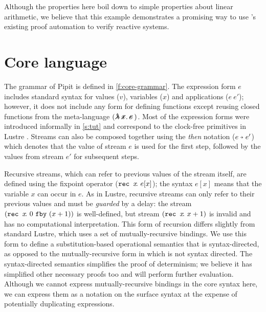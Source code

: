 \documentclass[sigplan,screen, review]{acmart}
\begin{document}
Although the properties here boil down to simple properties about linear arithmetic, we believe that this example demonstrates a promising way to use \fstar{}'s existing proof automation to verify reactive systems.

\section{Core language}
\label{s:core}


% 
% 

The grammar of Pipit is defined in \autoref{f:core-grammar}.
The expression form $e$ includes standard syntax for values ($v$), variables ($x$) and applications ($e~e'$); however, it does not include any form for defining functions except reusing closed functions from the \fstar{} meta-language $(\mlamX{})$.
Most of the expression forms were introduced informally in \autoref{s:tut} and correspond to the clock-free primitives in Lustre \cite{caspi1995functional}.
Streams can also be composed together using the \emph{then} notation ($\xthen{e}{e'}$) which denotes that the value of stream $e$ is used for the first step, followed by the values from stream $e'$ for subsequent steps.

Recursive streams, which can refer to previous values of the stream itself, are defined using the fixpoint operator ($\texttt{rec~} x \!.~e[x]$); the syntax $e[x]$ means that the variable $x$ can occur in $e$.
As in Lustre, recursive streams can only refer to their previous values and must be \emph{guarded} by a delay: the stream $(\texttt{rec~} x \!.~0~\texttt{fby}~(x + 1))$ is well-defined, but stream $(\texttt{rec~} x \!.~x + 1)$ is invalid and has no computational interpretation.
This form of recursion differs slightly from standard Lustre, which uses a set of mutually-recursive bindings.
We use this form to define a substitution-based operational semantics that is syntax-directed, as opposed to the mutually-recursive form in \citet{caspi1995functional} which is not syntax directed.
The syntax-directed semantics simplifies the proof of determinism; we believe it has simplified other necessary proofs too and will perform further evaluation.
Although we cannot express mutually-recursive bindings in the core syntax here, we can express them as a notation on the surface syntax at the expense of potentially duplicating expressions.
\end{document}
